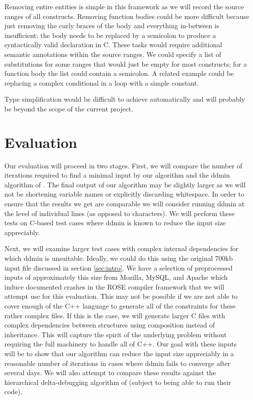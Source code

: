 \documentclass[11pt]{article}
\begin{document}
Removing entire entities is simple in this framework as we will record the
source ranges of all constructs.  Removing function bodies could be more
difficult because just removing the curly braces of the body and everything
in-between is insufficient; the body needs to be replaced by a semicolon to
produce a syntactically valid declaration in C. These tasks would require
additional semantic annotations within the source ranges. We could specify a
list of substitutions for some ranges that would just be empty for most
constructs; for a function body the list could contain a semicolon.  A related
example could be replacing a complex conditional in a loop with a simple
constant.


Type simplification would be difficult to achieve automatically and will
probably be beyond the scope of the current project.

\section{Evaluation}
Our evaluation will proceed in two stages.  First, we will compare the number of
iterations required to find a minimal input by our algorithm and the ddmin
algorithm of \citeauthor{dd}.  The final output of our algorithm may be slightly
larger as we will not be shortening variable names or explicitly discarding
whitespace.  In order to ensure that the results we get are comparable we will
consider running ddmin at the level of individual lines (as opposed to
characters). We will perform these tests on C-based test cases where ddmin is
known to reduce the input size appreciably.

Next, we will examine larger test cases with complex internal dependencies for
which ddmin is unsuitable.  Ideally, we could do this using the original 700kb
input file discussed in section \ref{sec:intro}.  We have a selection of
preprocessed inputs of approximately this size from Mozilla, MySQL, and Apache
which induce documented crashes in the ROSE compiler framework \citep{rose} that
we will attempt use for this evaluation.  This may not be possible if we are not
able to cover enough of the C++ language to generate all of the constraints for
these rather complex files.  If this is the case, we will generate larger C
files with complex dependencies between structures using composition instead of
inheritance.  This will capture the spirit of the underlying problem without
requiring the full machinery to handle all of C++.  Our goal with these inputs
will be to show that our algorithm can reduce the input size appreciably in a
reasonable number of iterations in cases where ddmin fails to converge after
several days. We will also attempt to compare these results against the
hierarchical delta-debugging algorithm of \citeauthor{hdd} (subject to being
able to run their code).
\end{document}
